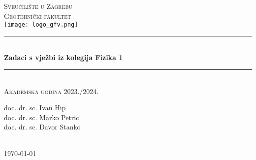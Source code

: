 \documentclass[10pt]{book}
\begin{document}
\begin{titlepage}

\newcommand{\HRule}{\rule{\linewidth}{0.5mm}} %

\center %

\textsc{\Large Sveučilište u Zagrebu\\ Geotehnički fakultet}\\[1.0cm] %

\texttt{[image: logo\_gfv.png]}\\[2.0cm] %


\HRule \\[0.4cm]
{ \huge \bfseries Zadaci s vježbi iz kolegija Fizika 1}\\[0.4cm] %
\HRule \\[1.5cm]

\textsc{\large Akademska godina 2023./2024.}\\[0.5cm] %

\justify
 
\begin{center}
\begin{minipage}{0.8\textwidth}
\begin{justify} 
\vspace{1.2cm}
\begin{center}
doc. dr. sc. Ivan Hip\\
doc. dr. sc. Marko Petric\\
doc. dr. sc. Davor Stanko
                     
\end{center}

\end{justify}
\end{minipage}\\[3cm]
\today
\end{center}


\end{titlepage}
\end{document}
